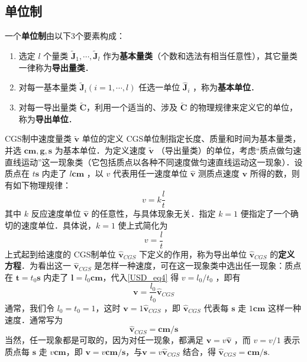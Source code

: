 \subsection{单位制}
一个\textbf{单位制}由以下3个要素构成：
\begin{enumerate}
\item 选定 $l$ 个量类 $\tilde{\boldsymbol{J}}_1,\cdots,\tilde{\boldsymbol{J}}_l$ 作为\textbf{基本量类}（个数和选法有相当任意性），其它量类一律称为\textbf{导出量类}．  
\item 对每一基本量类 $\tilde{\boldsymbol{J}}_i(i=1,\cdots,l)$ 任选一单位 $\hat{\boldsymbol{J}}_i$ ，称为\textbf{基本单位}．
\item 对每一导出量类 $\tilde{\boldsymbol{C}}$，利用一个适当的、涉及 $\tilde{\boldsymbol{C}}$ 的物理规律来定义它的单位，称为\textbf{导出单位}．
\end{enumerate}
\begin{example}{CGS制中速度量类 $\tilde{\boldsymbol{v}
}$ 单位的定义}
CGS单位制指定长度、质量和时间为基本量类，并选 $\boldsymbol{cm},\boldsymbol{g},\boldsymbol{s}$ 为基本单位．为定义速度 $\tilde{\boldsymbol{v}}$ （导出量类）的单位，考虑“质点做匀速直线运动”这一现象类（它包括质点以各种不同速度做匀速直线运动这一现象）．设质点在 $t\boldsymbol{s}$ 内走了 $l\boldsymbol{cm}$ ，以 $v$ 代表用任一速度单位 $\hat{\boldsymbol{v}}$ 测质点速度 $\boldsymbol{v}$ 所得的数，则有如下物理规律：
\begin{equation}
v=k\frac{l}{t}
\end{equation}
其中 $k$ 反应速度单位 $\hat{\boldsymbol{v}}$ 的任意性，与具体现象无关．指定 $k=1$ 便指定了一个确切的速度单位．具体说，$k=1$ 使上式简化为
\begin{equation}\label{USD_eq4}
v=\frac{l}{t}
\end{equation}
上式起到给速度的 CGS制单位 $\hat{\boldsymbol{v}}_{CGS}$ 下定义的作用，称为导出单位 $\hat{\boldsymbol{v}}_{CGS}$ 的\textbf{定义方程}．为看出这一 $\hat{\boldsymbol{v}}_{CGS}$ 是怎样一种速度，可在这一现象类中选出任一现象：质点在 $\boldsymbol{t}=t_0\boldsymbol{s}$ 内走了 $\boldsymbol{l}=l_0\boldsymbol{cm}$，代入\autoref{USD_eq4} 得 $v=l_0/t_0$ ，即有
\begin{equation}
\boldsymbol{v}=\frac{l_0}{t_0}\hat{\boldsymbol{v}}_{CGS}
\end{equation}
通常，我们令 $l_0=t_0=1$，这时 $\boldsymbol{v}=1\hat{\boldsymbol{v}}_{CGS}$ ，即 $\hat{\boldsymbol{v}}_{CGS}$ 代表每 $\boldsymbol{s}$ 走 $1\boldsymbol{cm}$ 这样一种速度．通常写为
\begin{equation}
\hat{\boldsymbol{v}}_{CGS}=\boldsymbol{cm/s}
\end{equation}
当然，任一现象都是可取的，因为对任一现象，都满足 $\boldsymbol{v}=v\hat{\boldsymbol{v}}$ ，而 $v=v/1$ 表示质点每 $\boldsymbol{s}$ 走 $v\boldsymbol{cm}$，即 $\boldsymbol{v}=v\boldsymbol{cm/s}$，与$\boldsymbol{v}=v\hat{\boldsymbol{v}}_{CGS}$ 结合，得 $\hat{\boldsymbol{v}}_{CGS}=\boldsymbol{cm/s}$.

\end{example}
